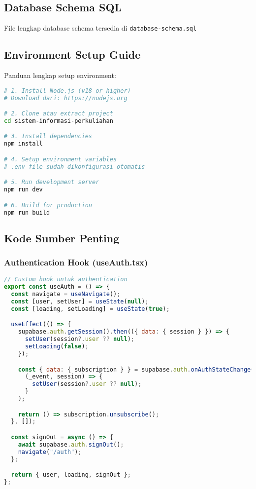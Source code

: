 \documentclass[12pt,a4paper]{article}
\begin{document}
\subsection{Database Schema SQL}

File lengkap database schema tersedia di \texttt{database-schema.sql}

\subsection{Environment Setup Guide}

Panduan lengkap setup environment:

\begin{lstlisting}[language=bash]
# 1. Install Node.js (v18 or higher)
# Download dari: https://nodejs.org

# 2. Clone atau extract project
cd sistem-informasi-perkuliahan

# 3. Install dependencies
npm install

# 4. Setup environment variables
# .env file sudah dikonfigurasi otomatis

# 5. Run development server
npm run dev

# 6. Build for production
npm run build
\end{lstlisting}

\subsection{Kode Sumber Penting}

\subsubsection{Authentication Hook (useAuth.tsx)}
\begin{lstlisting}[language=JavaScript]
// Custom hook untuk authentication
export const useAuth = () => {
  const navigate = useNavigate();
  const [user, setUser] = useState(null);
  const [loading, setLoading] = useState(true);

  useEffect(() => {
    supabase.auth.getSession().then(({ data: { session } }) => {
      setUser(session?.user ?? null);
      setLoading(false);
    });

    const { data: { subscription } } = supabase.auth.onAuthStateChange(
      (_event, session) => {
        setUser(session?.user ?? null);
      }
    );

    return () => subscription.unsubscribe();
  }, []);

  const signOut = async () => {
    await supabase.auth.signOut();
    navigate("/auth");
  };

  return { user, loading, signOut };
};
\end{lstlisting}
\end{document}
